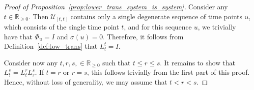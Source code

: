 \documentclass[10pt,a4paper]{paper}
\theoremstyle{definition}
\newcommand{\nats}{\mathbb{N}}
\newcommand{\reals}{\mathbb{R}}
\newcommand{\realsnonneg}{\reals_{\geq 0}}
\newcommand{\lrate}{\underline{Q}}
\begin{document}
\begin{proof}[Proof of Proposition~\ref{prop:lower_trans_system_is_system}]
Consider any $t\in\realsnonneg$. Then $\mathcal{U}_{[t,t]}$ contains only a single degenerate sequence of time points $u$, which consists of the single time point $t$, and for this sequence $u$, we trivially have that $\Phi_u=I$ and $\sigma(u)=0$. Therefore, it follows from Definition~\ref{def:low_trans} that $L_t^t=I$.


Consider now any $t,r,s,\in\realsnonneg$ such that $t\leq r\leq s$. It remains to show that $L_t^s=L_t^rL_r^s$. If $t=r$ or $r=s$, this follows trivially from the first part of this proof. Hence, without loss of generality, we may assume that $t<r<s$.


\end{proof}
\end{document}
